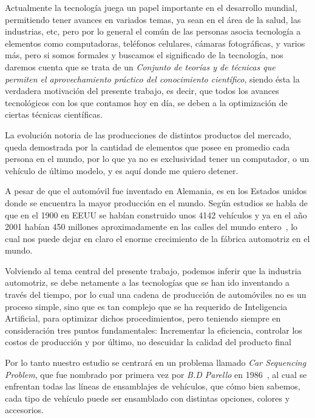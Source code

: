 Actualmente la tecnología juega un papel importante en el desarrollo mundial,
permitiendo tener avances en variados temas, ya sean en el área de la salud,
las industrias, etc, pero por lo general el común de las personas asocia
tecnología a elementos como computadoras, teléfonos celulares, cámaras fotográficas,
y varios más, pero si somos formales y buscamos el significado de la tecnología,
nos daremos cuenta que se trata de un \emph{Conjunto de teorías y de técnicas que permiten
el aprovechamiento práctico del conocimiento científico}, siendo ésta la verdadera
motivación del presente trabajo, es decir, que todos los avances tecnológicos
con los que contamos hoy en día, se deben a la optimización de ciertas técnicas científicas.

La evolución notoria de las producciones de distintos productos del mercado, queda demostrada
por la cantidad de elementos que posee en promedio cada persona en el mundo, por lo que ya no es
exclusividad tener un computador, o un vehículo de último modelo, y es aquí donde me quiero detener.

A pesar de que el automóvil fue inventado en Alemania, es en los Estados unidos donde se encuentra
la mayor producción en el mundo. Según estudios se habla de que en el 1900 en EEUU se habían
construido unos 4142 vehículos y ya en el año 2001 habían 450 millones aproximadamente en las calles
del mundo entero~\cite{stasenko}, lo cual nos puede dejar en claro el enorme crecimiento de la fábrica automotriz en
el mundo.

Volviendo al tema central del presente trabajo, podemos inferir que la industria automotriz,
se debe netamente a las tecnologías que se han ido inventando a través del tiempo, por lo cual
una cadena de producción de automóviles no es un proceso simple, sino que es tan complejo
que se ha requerido de Inteligencia Artificial, para optimizar dichos procedimientos,
pero teniendo siempre en consideración tres puntos fundamentales: Incrementar la eficiencia,
controlar los costos de producción y por último, no descuidar la calidad del producto final

Por lo tanto nuestro estudio se centrará en un problema llamado \emph{Car Sequencing Problem},
que fue nombrado por primera vez por \emph{B.D Parello} en 1986~\cite{parello}, al cual se enfrentan
todas las líneas de ensamblajes de vehículos, que cómo bien sabemos, cada tipo de vehículo puede ser ensamblado
con distintas opciones, colores y accesorios.

